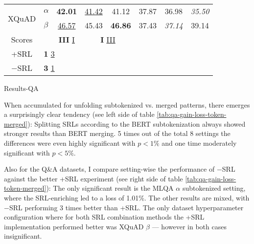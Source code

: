 {{\begin{tabular}{llccc|ccc}
    \multicolumn{1}{c}{\multirow{2}{*}{XQuAD}} & $\alpha$  & \multicolumn{1}{c|}{\textbf{42.01}}             & \multicolumn{1}{c}{\underline{41.42}} & \multicolumn{1}{c|}{41.12}             & \multicolumn{1}{c|}{37.87}          & \multicolumn{1}{c}{36.98}          & \multicolumn{1}{c}{\textit{35.50}} \\
    \multicolumn{1}{c}{}                       & $\beta$   & \multicolumn{1}{c|}{\underline{46.57}}          & \multicolumn{1}{c}{45.43}             & \multicolumn{1}{c|}{\textbf{46.86}}    & \multicolumn{1}{c|}{37.43}          & \multicolumn{1}{c}{\textit{37.14}} & \multicolumn{1}{c}{39.14}          \\ \hline\hline
    \multicolumn{1}{c}{Scores}                 &           & \multicolumn{1}{c|}{\textbf{III} \underline{I}} & \multicolumn{2}{c|}{\textbf{I} \underline{III}}                                & \multicolumn{1}{c|}{}               & \multicolumn{2}{c}{}                                                    \\ \cline{1-2}
    \multicolumn{1}{c}{+SRL}                   & \multicolumn{3}{l}{\textbf{1} \underline{3}} \\
    \multicolumn{1}{c}{$-$SRL}                 & \multicolumn{3}{l}{\textbf{3} \underline{1}}

    \end{tabular}
  }
}{Results-QA}

When accumulated for unfolding subtokenized vs. merged patterns, there emerges a surprisingly
clear tendency (see left side of table \ref{tab:qa-gain-loss-token-merged}): Splitting SRLs according to
the BERT subtokenization always showed stronger results than BERT merging. 5 times out of the
total 8 settings the differences were even highly significant with $p < 1\%$ and one time
moderately significant with $p < 5\%$.

Also for the Q\&A datasets, I compare setting-wise the performance of $-$SRL against the better +SRL experiment
(see right side of table \ref{tab:qa-gain-loss-token-merged}): The only significant result is the MLQA $\alpha$
subtokenized setting, where the SRL-enriching led to a loss of 1.01\%. The other results are mixed, with $-$SRL
performing 3 times better than +SRL.
The only dataset hyperparameter configuration where for both SRL combination methods the +SRL implementation
performed better was XQuAD $\beta$ --- however in both cases insignificant.



